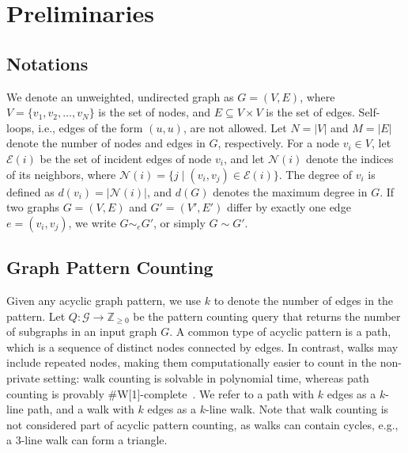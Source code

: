 

\section{Preliminaries}


\subsection{Notations}


We denote an unweighted, undirected graph as $G = (V, E)$, where $V = \{v_1, v_2, \ldots, v_N\}$ is the set of nodes, and $E \subseteq V \times V$ is the set of edges.
Self-loops, i.e., edges of the form $(u,u)$, are not allowed.
Let $N = |V|$ and $M = |E|$ denote the number of nodes and edges in $G$, respectively. 
For a node $v_i \in V$, 
let $\mathcal{E}(i)$ be the set of incident edges of node $v_i$, and
let $\mathcal{N}(i)$ denote the indices of its neighbors, where $\mathcal{N}(i) = \{j \mid (v_i, v_j) \in \mathcal{E}(i)\}$. 
The degree of $v_i$ is defined as $d(v_{i}) = |\mathcal{N}(i)|$, and $d(G)$ denotes the maximum degree in $G$. 
If two graphs $G = (V, E)$ and $G' = (V', E')$ differ by exactly one edge $e = (v_i, v_j)$, 
we write $G \sim_e G'$, or simply $G \sim G'$.



\subsection{Graph Pattern Counting}
\label{subsec:prelim_pattern_counting}



Given any acyclic graph pattern, we use $k$ to denote the number of edges in the pattern. 
Let $Q: \mathcal{G} \to \mathbb{Z}_{\geq 0}$ be the pattern counting query that returns the number of subgraphs in an input graph $G$.
A common type of acyclic pattern is a path, which is a sequence of distinct nodes connected by edges. 
In contrast, walks may include repeated nodes, making them computationally easier to count in the non-private setting: walk counting is solvable in polynomial time, whereas path counting is provably \#W[1]-complete~\cite{flum2004parameterized}.
We refer to a path with $k$ edges as a $k$-line path, and a walk with $k$ edges as a $k$-line walk.
Note that walk counting is not considered part of acyclic pattern counting, as walks can contain cycles, e.g., a $3$-line walk can form a triangle.


